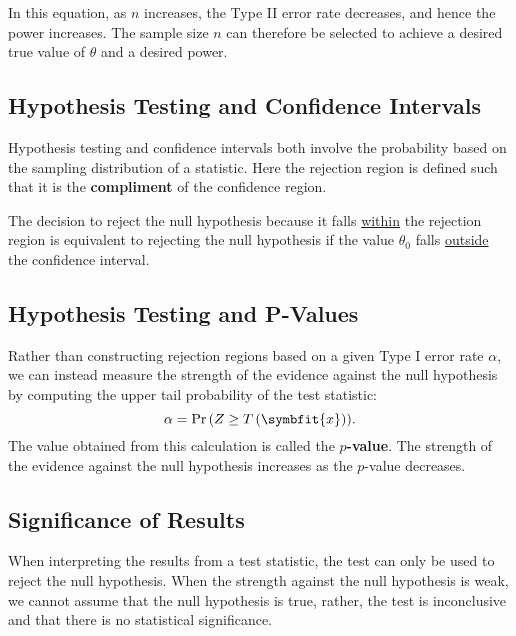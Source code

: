 \documentclass{article}
\begin{document}
In this equation, as \(n\) increases, the Type II error rate decreases, and hence the power increases.
The sample size \(n\) can therefore be selected to achieve a desired true value of \(\theta\) and a desired power.
\subsection{Hypothesis Testing and Confidence Intervals}
Hypothesis testing and confidence intervals both involve the probability based on the sampling distribution of a statistic.
Here the rejection region is defined such that it is the \textbf{compliment} of the confidence region.

The decision to reject the null hypothesis because it falls \underline{within} the rejection region is equivalent to
rejecting the null hypothesis if the value \(\theta_0\) falls \underline{outside} the confidence interval.
\subsection{Hypothesis Testing and P-Values}
Rather than constructing rejection regions based on a given Type I error rate \(\alpha\), we
can instead measure the strength of the evidence against the null hypothesis by computing the
upper tail probability of the test statistic:
\begin{equation*}
    \alpha = \Pr{\left( Z \geq T\left( \symbfit{x} \right) \right)}.
\end{equation*}
The value obtained from this calculation is called the \textbf{\(p\)-value}.
The strength of the evidence against the null hypothesis increases as the \(p\)-value decreases.
\subsection{Significance of Results}
When interpreting the results from a test statistic, the test can only be used to reject the null hypothesis.
When the strength against the null hypothesis is weak, we cannot assume that the null hypothesis is true,
rather, the test is inconclusive and that there is no statistical significance.
\end{document}
